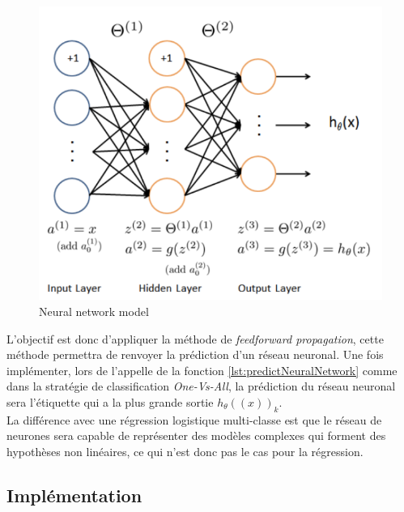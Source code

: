 \begin{figure}[!h]
    \begin{center}
        \includegraphics[width=.75\textwidth]{./img/1.1.png}
        \caption{\label{fig:1.1}Neural network model}
    \end{center}
 \end{figure}

 

L'objectif est donc d'appliquer la méthode de \textit{feedforward propagation}, 
cette méthode permettra de renvoyer la prédiction d'un réseau neuronal. Une fois implémenter, lors de 
l'appelle de la fonction \ref{lst:predictNeuralNetwork} comme dans la stratégie de classification \textit{One-Vs-All}, 
la prédiction du réseau neuronal sera l'étiquette qui a la plus grande sortie $h_{\theta}((x))_k$. \\

\noindent
La différence avec une régression logistique multi-classe est que le réseau de neurones sera capable de représenter des modèles 
complexes qui forment des hypothèses non linéaires, ce qui n'est donc pas le cas pour la régression. 

\clearpage

\subsection{Implémentation}

